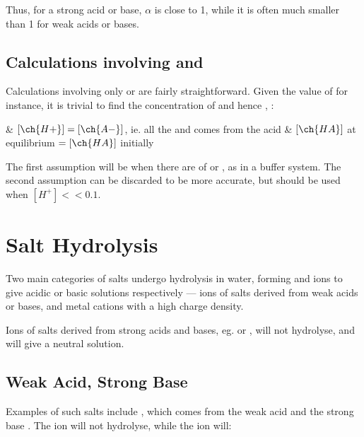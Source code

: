 			Thus, for a strong acid or base, $\alpha$ is close to 1, while it is often much smaller than 1 for weak acids or bases.



		\subsection{Calculations involving \texorpdfstring{\Ka{}}{Ka} and \texorpdfstring{\Kb{}}{Kb}}

			Calculations involving only \Ka{} or \Kb{} are fairly straightforward. Given the value of \Ka{} for instance, it is trivial
			to find the concentration of  and hence \pH{}, :

			\begin{bulletlist}
				& $[\ch{H+}] = [\ch{A-}]$, ie. all the  and  comes from the acid
				& $[\ch{HA}]$ at equilibrium $ = [\ch{HA}]$ initially
			\end{bulletlist}

			The first assumption will be  when there are  of  or , as in a buffer
			system. The second assumption can be discarded to be more accurate, but should be used when $[H^{+}] << 0.1$.



	\pagebreak
	\section{Salt Hydrolysis}

		Two main categories of salts undergo hydrolysis in water, forming  and  ions to give acidic or basic solutions
		respectively --- ions of salts derived from weak acids or bases, and metal cations with a high charge density.

		Ions of salts derived from strong acids and bases, eg.  or , will not hydrolyse, and will give a neutral solution.


		\subsection{Weak Acid, Strong Base}

			Examples of such salts include , which comes from the weak acid  and the strong base .
			The  ion will not hydrolyse, while the  ion will:


